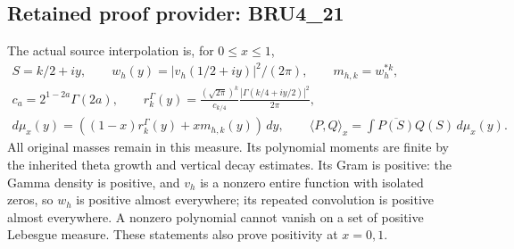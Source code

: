 \documentclass[11pt,a4paper]{article}
\begin{document}

\clearpage
\subsection*{Retained proof provider: BRU4\_21}

The actual source interpolation is, for $0\leq x\leq1$,
\[
 \begin{gathered}
 S=k/2+iy,\qquad w_h(y)=|v_h(1/2+iy)|^2/(2\pi),\qquad
 m_{h,k}=w_h^{*k},\\
 c_a=2^{1-2a}\Gamma(2a),\qquad
 r_k^\Gamma(y)=\frac{(\sqrt{2\pi})^k}{c_{k/4}}
                   \frac{|\Gamma(k/4+iy/2)|^2}{2\pi},\\
 d\mu_x(y)=((1-x)r_k^\Gamma(y)+xm_{h,k}(y))\,dy,\qquad
 \langle P,Q\rangle_x=\int\overline{P(S)}Q(S)\,d\mu_x(y).
 \end{gathered}\tag{BRU4}
\]
All original masses remain in this measure. Its polynomial moments
are finite by the inherited theta growth and vertical decay estimates.
Its Gram is positive: the Gamma density is positive, and $v_h$ is
a nonzero entire function with isolated zeros, so $w_h$ is positive
almost everywhere; its repeated convolution is positive almost
everywhere. A nonzero polynomial cannot vanish on a set of positive
Lebesgue measure. These statements also prove positivity at $x=0,1$.
\end{document}
